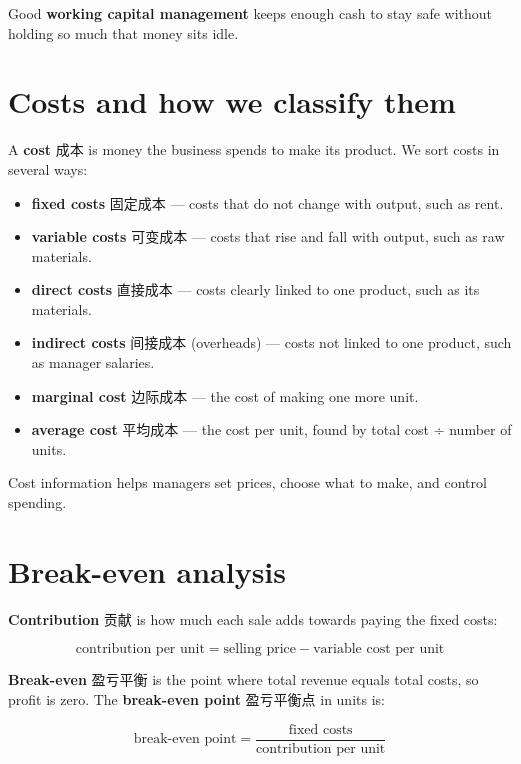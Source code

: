 \documentclass[11pt]{article}
\begin{document}
Good \textbf{working capital management} keeps enough cash to stay safe without holding so much that money sits idle.

\section*{Costs and how we classify them}

A \textbf{cost} 成本 is money the business spends to make its product. We sort costs in several ways:

\begin{itemize}
\item \textbf{fixed costs} 固定成本 — costs that do not change with output, such as rent.

\item \textbf{variable costs} 可变成本 — costs that rise and fall with output, such as raw materials.

\item \textbf{direct costs} 直接成本 — costs clearly linked to one product, such as its materials.

\item \textbf{indirect costs} 间接成本 (overheads) — costs not linked to one product, such as manager salaries.

\item \textbf{marginal cost} 边际成本 — the cost of making one more unit.

\item \textbf{average cost} 平均成本 — the cost per unit, found by total cost ÷ number of units.

\end{itemize}

Cost information helps managers set prices, choose what to make, and control spending.

\section*{Break-even analysis}

\textbf{Contribution} 贡献 is how much each sale adds towards paying the fixed costs:

\[
\text{contribution per unit} = \text{selling price} - \text{variable cost per unit}
\]

\textbf{Break-even} 盈亏平衡 is the point where total revenue equals total costs, so profit is zero. The \textbf{break-even point} 盈亏平衡点 in units is:

\[
\text{break-even point} = \frac{\text{fixed costs}}{\text{contribution per unit}}
\]
\end{document}
